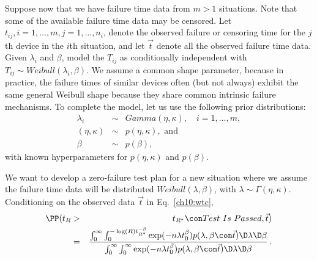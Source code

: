 \documentclass {book}
\begin{document}
Suppose now that we have failure time data from $m > 1$
situations. Note that some of the available failure time data may
be censored. Let $t_{ij}, i = 1, \ldots, m,  j = 1, \ldots,
n_{i}$, denote the observed failure or censoring time for the
$j$th device in the $i$th situation, and let $\vec{t}$ denote all
the observed failure time data. Given $\lambda_{i}$ and $\beta$,
model the $T_{ij}$ as conditionally independent with $T_{ij} \sim
Weibull(\lambda_{i}, \beta)$. We assume a common shape parameter,
because in practice, the failure times of similar devices often
(but not always) exhibit the same general Weibull shape because
they share common intrinsic failure mechanisms. To complete the
model, let us use the following prior distributions:
\begin{eqnarray*}
\lambda_{i} & \sim & Gamma(\eta, \kappa), \quad i = 1, \ldots, m, \\
(\eta, \kappa) & \sim & p(\eta, \kappa), \mbox{ and}\\
\beta & \sim & p(\beta),
\end{eqnarray*}
with known hyperparameters for $p(\eta, \kappa)$ and $p(\beta)$.

We want to develop a zero-failure test plan for a new situation
where we assume the failure time data will be distributed
$Weibull(\lambda,\beta)$, with $\lambda \sim \Gamma(\eta,
\kappa)$. Conditioning on the observed data $\vec{t}$ in
Eq.~\ref{ch10:wtc},
\begin{eqnarray}\label{ch10:wtc2}
\PP(t_{R} & > & t_{R^*} \con Test\mbox{ } Is\mbox{ }Passed,
\vec{t})\\\nonumber & = & \frac{\int_0^\infty
\int^{-\log(R)t_{R^*}^{-\beta}}_0 \exp(-n\lambda t_0^{\beta})
p(\lambda, \beta \con \vec{t}) \D \lambda \D \beta}{\int_0^\infty
\int_0^\infty \exp(-n\lambda t_0^{\beta}) p(\lambda, \beta \con
\vec{t}) \D \lambda \D \beta} \, .
\end{eqnarray}
\end{document}
